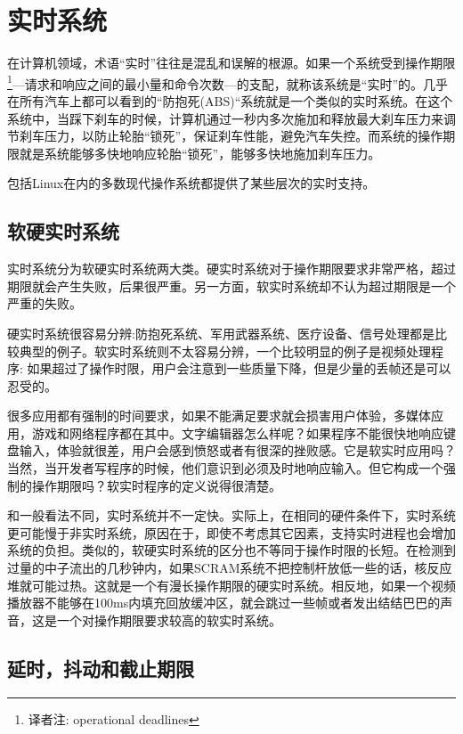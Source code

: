 \section{实时系统}

  在计算机领域，术语“实时”往往是混乱和误解的根源。如果一个系统受到操作期限\footnote[1]{译者注: operational deadlines}---请求和响应之间的最小量和命令次数---的支配，就称该系统是“实时”的。几乎在所有汽车上都可以看到的“防抱死(ABS)“系统就是一个类似的实时系统。在这个系统中，当踩下刹车的时候，计算机通过一秒内多次施加和释放最大刹车压力来调节刹车压力，以防止轮胎“锁死”，保证刹车性能，避免汽车失控。而系统的操作期限就是系统能够多快地响应轮胎“锁死”，能够多快地施加刹车压力。

  包括Linux在内的多数现代操作系统都提供了某些层次的实时支持。

\subsection{软硬实时系统}

  实时系统分为软硬实时系统两大类。硬实时系统对于操作期限要求非常严格，超过期限就会产生失败，后果很严重。另一方面，软实时系统却不认为超过期限是一个严重的失败。

  硬实时系统很容易分辨:防抱死系统、军用武器系统、医疗设备、信号处理都是比较典型的例子。软实时系统则不太容易分辨，一个比较明显的例子是视频处理程序: 如果超过了操作时限，用户会注意到一些质量下降，但是少量的丢帧还是可以忍受的。

  很多应用都有强制的时间要求，如果不能满足要求就会损害用户体验，多媒体应用，游戏和网络程序都在其中。文字编辑器怎么样呢？如果程序不能很快地响应键盘输入，体验就很差，用户会感到愤怒或者有很深的挫败感。它是软实时应用吗？当然，当开发者写程序的时候，他们意识到必须及时地响应输入。但它构成一个强制的操作期限吗？软实时程序的定义说得很清楚。

  和一般看法不同，实时系统并不一定快。实际上，在相同的硬件条件下，实时系统更可能慢于非实时系统，原因在于，即使不考虑其它因素，支持实时进程也会增加系统的负担。类似的，软硬实时系统的区分也不等同于操作时限的长短。在检测到过量的中子流出的几秒钟内，如果SCRAM系统不把控制杆放低一些的话，核反应堆就可能过热。这就是一个有漫长操作期限的硬实时系统。相反地，如果一个视频播放器不能够在100ms内填充回放缓冲区，就会跳过一些帧或者发出结结巴巴的声音，这是一个对操作期限要求较高的软实时系统。

\subsection{延时，抖动和截止期限}

